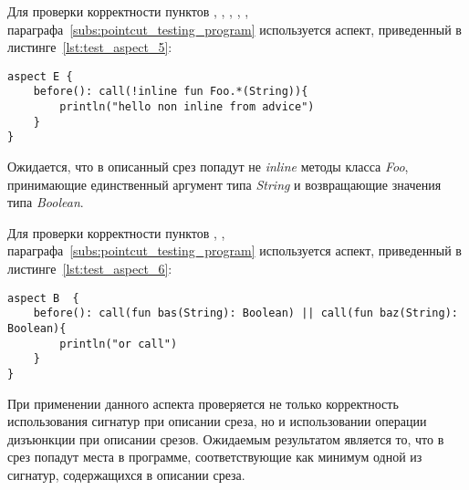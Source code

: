 Для проверки корректности пунктов \quotes{\ref{list:method_name_check}},
\quotes{\ref{list:class_name_check}},
\quotes{\ref{list:method_params_check}},
\quotes{\ref{list:method_modifiers_check}},
\quotes{\ref{list:method_inline_check}},
\quotes{\ref{list:logic_operations_check}} параграфа~\ref{subs:pointcut_testing_program} используется аспект, приведенный в листинге~\ref{lst:test_aspect_5}:
\begin{lstlisting}[style={java}, label={lst:test_aspect_5},
  caption={Пример тестового аспекта}]
aspect E {
    before(): call(!inline fun Foo.*(String)){
        println("hello non inline from advice")
    }
}
\end{lstlisting}
Ожидается, что в описанный срез попадут не \textit{inline} методы класса \textit{Foo}, принимающие единственный аргумент типа \textit{String} и возвращающие значения типа \textit{Boolean}.

 Для проверки корректности пунктов
 \quotes{\ref{list:method_name_check}},
 \quotes{\ref{list:class_name_check}},
 \quotes{\ref{list:logic_operations_check}} параграфа~\ref{subs:pointcut_testing_program} используется аспект, приведенный в листинге~\ref{lst:test_aspect_6}:
\begin{lstlisting}[style={java}, label={lst:test_aspect_6},
  caption={Пример тестового аспекта}]
aspect B  {
    before(): call(fun bas(String): Boolean) || call(fun baz(String): Boolean){
        println("or call")
    }
}
\end{lstlisting}
При применении данного аспекта проверяется не только корректность использования сигнатур при описании среза, но и использовании операции дизъюнкции при описании срезов.
Ожидаемым результатом является то, что в срез попадут места в программе, соответствующие как минимум одной из сигнатур, содержащихся в описании среза.
